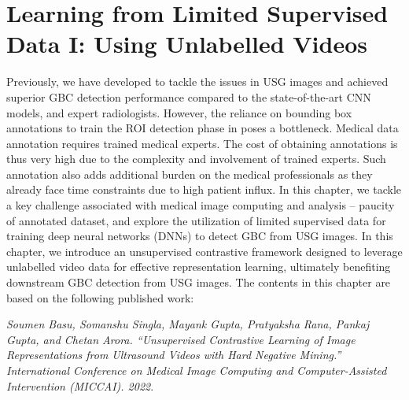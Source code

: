 \chapter{Learning from Limited Supervised Data I: Using Unlabelled Videos}
\label{chap:limited}
Previously, we have developed \gbcnet to tackle the issues in USG images and achieved superior GBC detection performance compared to the state-of-the-art CNN models, and expert radiologists. However, the reliance on bounding box annotations to train the ROI detection phase in \gbcnet poses a bottleneck. Medical data annotation requires trained medical experts. The cost of obtaining annotations is thus very high due to the complexity and involvement of trained experts. Such annotation also adds additional burden on the medical professionals as they already face time constraints due to high patient influx. In this chapter, we tackle a key challenge associated with medical image computing and analysis -- paucity of annotated dataset, and explore the utilization of limited supervised data for training deep neural networks (DNNs) to detect GBC from USG images. In this chapter, 
we introduce an unsupervised contrastive framework designed to leverage unlabelled video data for effective representation learning, ultimately benefiting downstream GBC detection from USG images.%
The contents in this chapter are based on the following published work:
\par \noindent [1] \textit{Soumen Basu, Somanshu Singla, Mayank Gupta, Pratyaksha Rana, Pankaj Gupta, and Chetan Arora.
``Unsupervised Contrastive Learning of Image Representations from Ultrasound Videos with Hard Negative Mining.'' International Conference on Medical Image Computing and Computer-Assisted Intervention (MICCAI). 2022}. 

\label{chap:usucl}

